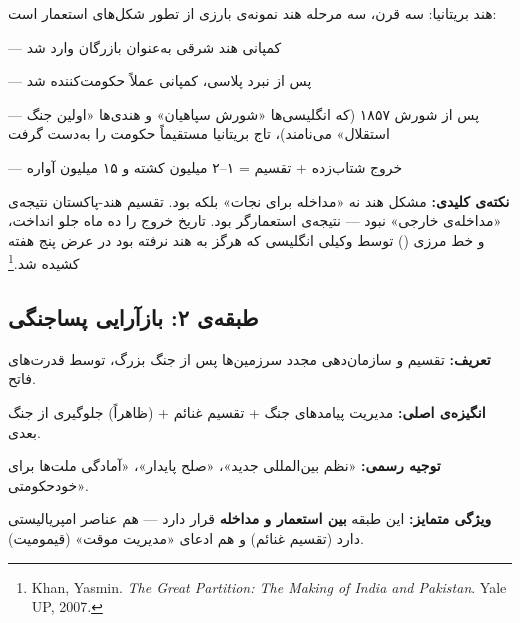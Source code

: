 \begin{caseStudy}{هند بریتانیا: سه قرن، سه مرحله}
هند نمونه‌ی بارزی از تطور شکل‌های استعمار است:

\begin{description}[leftmargin=!, labelwidth=4.5cm,
  font=\bfseries\color{PrimaryMid}]
\item[مرحله ۱ \dated{۱۶۰۰–۱۷۵۷}]
   — کمپانی هند شرقی به‌عنوان بازرگان وارد شد
\item[مرحله ۲ \dated{۱۷۵۷–۱۸۵۸}]
   — پس از نبرد پلاسی، کمپانی عملاً
  حکومت‌کننده شد
\item[مرحله ۳ \dated{۱۸۵۸–۱۹۴۷}]
   — پس از شورش ۱۸۵۷ (که انگلیسی‌ها
  «شورش سپاهیان» و هندی‌ها «اولین جنگ استقلال» می‌نامند)، تاج
  بریتانیا مستقیماً حکومت را به‌دست گرفت
\item[مرحله ۴ \dated{۱۹۴۷}]
   — خروج شتاب‌زده + تقسیم =
  ۱–۲ میلیون کشته و ۱۵ میلیون آواره
\end{description}

\textbf{نکته‌ی کلیدی:} مشکل هند نه «مداخله برای نجات» بلکه
 بود.  تقسیم هند-پاکستان نتیجه‌ی «مداخله‌ی
خارجی» نبود — نتیجه‌ی  استعمارگر بود.
 تاریخ خروج را ده ماه جلو انداخت، و خط مرزی
() توسط وکیلی انگلیسی که هرگز به هند نرفته بود در عرض
پنج هفته کشیده شد.\footnote{Khan, Yasmin.
\textit{The Great Partition: The Making of India and Pakistan}.
Yale UP, 2007.}
\end{caseStudy}


\subsection{طبقه‌ی ۲: بازآرایی پساجنگی}
\label{sec:tax-type2}

\begin{tcolorbox}[casebox, title={تعریف و ویژگی‌ها}]
\textbf{تعریف:} تقسیم و سازمان‌دهی مجدد سرزمین‌ها پس از جنگ بزرگ،
توسط قدرت‌های فاتح.

\textbf{انگیزه‌ی اصلی:} مدیریت پیامدهای جنگ + تقسیم غنائم +
(ظاهراً) جلوگیری از جنگ بعدی.

\textbf{توجیه رسمی:} «نظم بین‌المللی جدید»، «صلح پایدار»،
«آمادگی ملت‌ها برای خودحکومتی».

\textbf{ویژگی متمایز:} این طبقه \textbf{بین استعمار و مداخله} قرار
دارد — هم عناصر امپریالیستی دارد (تقسیم غنائم) و هم ادعای «مدیریت
موقت» (قیمومیت).
\end{tcolorbox}

